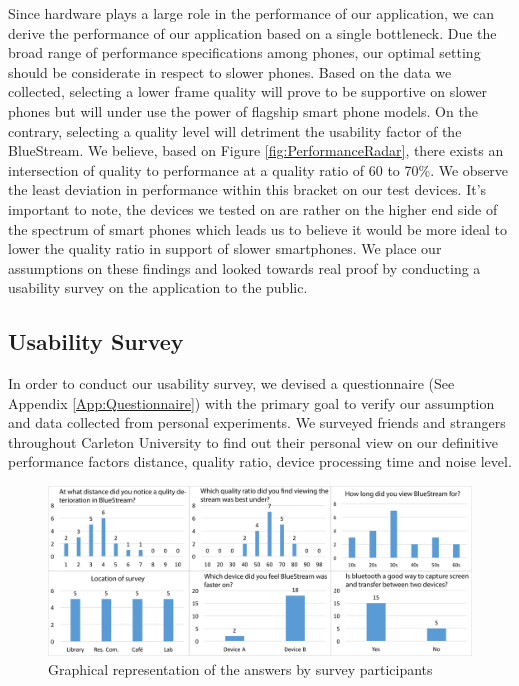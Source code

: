 \documentclass[a4paper,12pt]{article}
\begin{document}
Since hardware plays a large role in the performance of our application, we can derive the performance of our application based on a single bottleneck. Due the broad range of performance specifications among phones, our optimal setting should be considerate in respect to slower phones. Based on the data we collected, selecting a lower frame quality will prove to be supportive on slower phones but will under use the power of flagship smart phone models. On the contrary, selecting a quality level will detriment the usability factor of the BlueStream. We believe, based on Figure \ref{fig:PerformanceRadar}, there exists an intersection of quality to performance at a quality ratio of 60 to 70\%. We observe the least deviation in performance within this bracket on our test devices. It’s important to note, the devices we tested on are rather on the higher end side of the spectrum of smart phones which leads us to believe it would be more ideal to lower the quality ratio in support of slower smartphones. We place our assumptions on these findings and looked towards real proof by conducting a usability survey on the application to the public. 

\subsection{Usability Survey}

In order to conduct our usability survey, we devised a questionnaire (See Appendix \ref{App:Questionnaire}) with the primary goal to verify our assumption and data collected from personal experiments. We surveyed friends and strangers throughout Carleton University to find out their personal view on our definitive performance factors distance, quality ratio, device processing time and noise level. 

\begin{figure}[!ht]
\centering
\includegraphics[scale=.1]{Figures/Result.png}
\caption{Graphical representation of the answers by survey participants}
\label{fig:QuestionaireData}
\end{figure}
\end{document}
